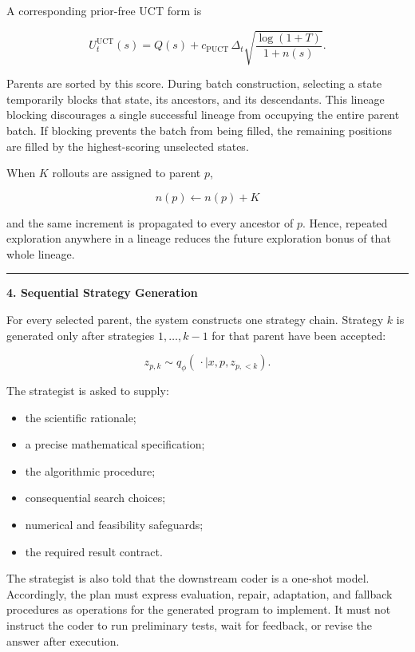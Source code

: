 \documentclass[
]{article}
\providecommand{\tightlist}{%
  \setlength{\itemsep}{0pt}\setlength{\parskip}{0pt}}
\begin{document}
A corresponding prior-free UCT form is

\[
U^{\mathrm{UCT}}_t(s)
=
Q(s)
+
c_{\mathrm{PUCT}}\,
\Delta_t
\sqrt{
\frac{\log(1+T)}{1+n(s)}
}.
\]

Parents are sorted by this score. During batch construction, selecting a
state temporarily blocks that state, its ancestors, and its descendants.
This lineage blocking discourages a single successful lineage from
occupying the entire parent batch. If blocking prevents the batch from
being filled, the remaining positions are filled by the highest-scoring
unselected states.

When \(K\) rollouts are assigned to parent \(p\),

\[
n(p)\leftarrow n(p)+K
\]

and the same increment is propagated to every ancestor of \(p\). Hence,
repeated exploration anywhere in a lineage reduces the future
exploration bonus of that whole lineage.

\begin{center}\rule{0.5\linewidth}{0.5pt}\end{center}

\textbf{4. Sequential Strategy Generation}

For every selected parent, the system constructs one strategy chain.
Strategy \(k\) is generated only after strategies \(1,\ldots,k-1\) for
that parent have been accepted:

\[
z_{p,k}
\sim
q_\phi(
\,\cdot\mid x,p,z_{p,<k}
).
\]

The strategist is asked to supply:

\begin{itemize}
\tightlist
\item
  the scientific rationale;
\item
  a precise mathematical specification;
\item
  the algorithmic procedure;
\item
  consequential search choices;
\item
  numerical and feasibility safeguards;
\item
  the required result contract.
\end{itemize}

The strategist is also told that the downstream coder is a one-shot
model. Accordingly, the plan must express evaluation, repair,
adaptation, and fallback procedures as operations for the generated
program to implement. It must not instruct the coder to run preliminary
tests, wait for feedback, or revise the answer after execution.
\end{document}

